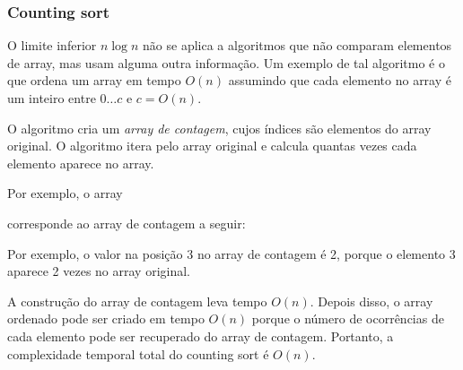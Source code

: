 \subsubsection{Counting sort}


O limite inferior $n \log n$ não se aplica a algoritmos que não comparam elementos de array, mas usam alguma outra informação. Um exemplo de tal algoritmo é o
 que ordena um array em tempo
$O(n)$ assumindo que cada elemento no array é um inteiro entre $0 \ldots c$ e $c=O(n)$.

O algoritmo cria um \emph{array de contagem},
cujos índices são elementos do array original.
O algoritmo itera pelo array original e calcula quantas vezes cada elemento aparece no array.
\newpage

Por exemplo, o array
\begin{center}
\end{center}
corresponde ao array de contagem a seguir:
\begin{center}
\end{center}

Por exemplo, o valor na posição 3
no array de contagem é 2,
porque o elemento 3 aparece 2 vezes
no array original.

A construção do array de contagem leva
tempo $O(n)$. Depois disso, o array ordenado pode ser criado em tempo $O(n)$ porque o número de ocorrências de cada elemento pode ser recuperado do array de contagem.
Portanto, a complexidade temporal total do counting sort é $O(n)$.

